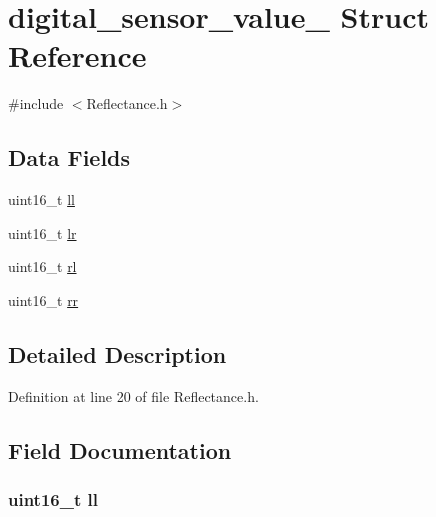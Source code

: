 \hypertarget{structdigital__sensor__value__}{}\section{digital\+\_\+sensor\+\_\+value\+\_\+ Struct Reference}
\label{structdigital__sensor__value__}


{\ttfamily \#include $<$Reflectance.\+h$>$}

\subsection*{Data Fields}
\begin{DoxyCompactItemize}
\item 
uint16\+\_\+t \hyperlink{structdigital__sensor__value___ae59d16ddcc59d6f6633ff99307ff7190}{ll}
\item 
uint16\+\_\+t \hyperlink{structdigital__sensor__value___af650f74b54fbe6d55c96161d2a7098ea}{lr}
\item 
uint16\+\_\+t \hyperlink{structdigital__sensor__value___a55f8b53aee5b41e8af88a816fab2b70b}{rl}
\item 
uint16\+\_\+t \hyperlink{structdigital__sensor__value___a6988d1a89f109b3f8d0e06547a5362f6}{rr}
\end{DoxyCompactItemize}


\subsection{Detailed Description}


Definition at line 20 of file Reflectance.\+h.



\subsection{Field Documentation}
\subsubsection[{\texorpdfstring{ll}{ll}}]{\setlength{\rightskip}{0pt plus 5cm}uint16\+\_\+t ll}\hypertarget{structdigital__sensor__value___ae59d16ddcc59d6f6633ff99307ff7190}{}\label{structdigital__sensor__value___ae59d16ddcc59d6f6633ff99307ff7190}


